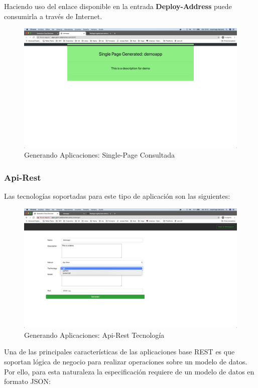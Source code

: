\documentclass[a4paper,11pt]{book}
\begin{document}
 Haciendo uso del enlace disponible en la entrada \textbf{Deploy-Address} puede consumirla a través de Internet. 

\begin{figure}[H]
\centering
\includegraphics[scale=0.2]{imagenes/casouso/17.png}
\caption{  Generando Aplicaciones: Single-Page Consultada }
\end{figure}

\subsubsection{Api-Rest}

Las tecnologías soportadas para este tipo de aplicación son las siguientes: 

\begin{figure}[H]
\centering
\includegraphics[scale=0.2]{imagenes/casouso/18.png}
\caption{  Generando Aplicaciones: Api-Rest Tecnología }
\end{figure}

Una de las principales características de las aplicaciones base REST es que soportan lógica de negocio para realizar operaciones sobre un modelo de datos. Por ello, para esta naturaleza la especificación requiere de un modelo de datos en formato JSON:
\end{document}
